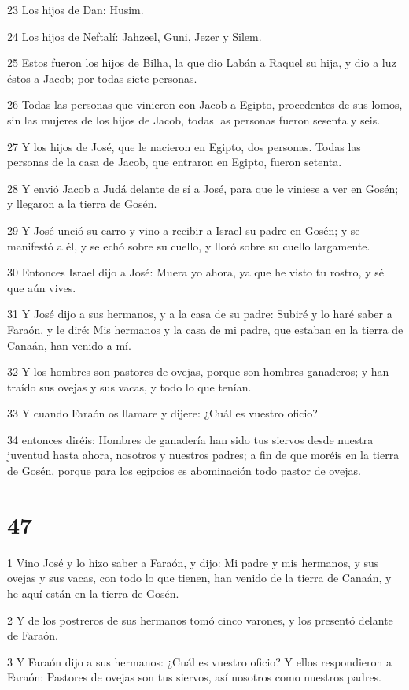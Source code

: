 23 Los hijos de Dan: Husim.

24 Los hijos de Neftalí: Jahzeel, Guni, Jezer y Silem.

25 Estos fueron los hijos de Bilha, la que dio Labán a Raquel su hija, y dio a luz éstos a Jacob; por todas siete personas.

26 Todas las personas que vinieron con Jacob a Egipto, procedentes de sus lomos, sin las mujeres de los hijos de Jacob, todas las personas fueron sesenta y seis.

27 Y los hijos de José, que le nacieron en Egipto, dos personas. Todas las personas de la casa de Jacob, que entraron en Egipto, fueron setenta.

28 Y envió Jacob a Judá delante de sí a José, para que le viniese a ver en Gosén; y llegaron a la tierra de Gosén.

29 Y José unció su carro y vino a recibir a Israel su padre en Gosén; y se manifestó a él, y se echó sobre su cuello, y lloró sobre su cuello largamente.

30 Entonces Israel dijo a José: Muera yo ahora, ya que he visto tu rostro, y sé que aún vives.

31 Y José dijo a sus hermanos, y a la casa de su padre: Subiré y lo haré saber a Faraón, y le diré: Mis hermanos y la casa de mi padre, que estaban en la tierra de Canaán, han venido a mí.

32 Y los hombres son pastores de ovejas, porque son hombres ganaderos; y han traído sus ovejas y sus vacas, y todo lo que tenían.

33 Y cuando Faraón os llamare y dijere: ¿Cuál es vuestro oficio?

34 entonces diréis: Hombres de ganadería han sido tus siervos desde nuestra juventud hasta ahora, nosotros y nuestros padres; a fin de que moréis en la tierra de Gosén, porque para los egipcios es abominación todo pastor de ovejas.

\chapter{47}

1 Vino José y lo hizo saber a Faraón, y dijo: Mi padre y mis hermanos, y sus ovejas y sus vacas, con todo lo que tienen, han venido de la tierra de Canaán, y he aquí están en la tierra de Gosén.

2 Y de los postreros de sus hermanos tomó cinco varones, y los presentó delante de Faraón.

3 Y Faraón dijo a sus hermanos: ¿Cuál es vuestro oficio? Y ellos respondieron a Faraón: Pastores de ovejas son tus siervos, así nosotros como nuestros padres.

